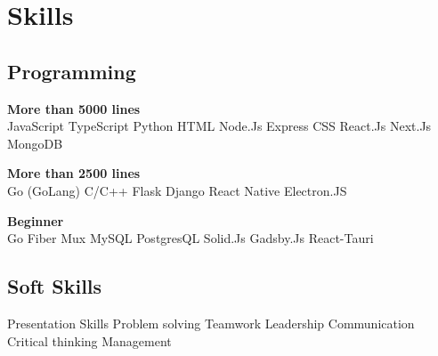 \documentclass[]{deedy-resume-openfont}
\begin{document}
\begin{minipage}[t]{0.33\textwidth}

\section{Skills}
\subsection{Programming}
{\bf More than 5000 lines} \\
JavaScript \textbullet{} TypeScript \textbullet{} Python \textbullet{} HTML \textbullet{} Node.Js \textbullet{} Express \textbullet{} CSS \textbullet{} React.Js \textbullet{} Next.Js \textbullet{} MongoDB \\
\sectionsep

{\bf More than 2500 lines} \\
Go (GoLang) \textbullet{} C/C++ \textbullet{} Flask \textbullet{} Django \textbullet{} React Native \textbullet{} Electron.JS \\
\sectionsep

{\bf Beginner} \\
Go Fiber \textbullet{} Mux \textbullet{} MySQL \textbullet{} PostgresQL \textbullet{} Solid.Js \textbullet{} Gadsby.Js \textbullet{} React-Tauri  \\
\sectionsep

\subsection{Soft Skills}
Presentation Skills \textbullet{} Problem solving \textbullet{} 
Teamwork \textbullet{} Leadership \textbullet{} Communication
\textbullet{} Critical thinking \textbullet{} Management \\

%
%

\end{minipage} 
\hfill
\end{document}
